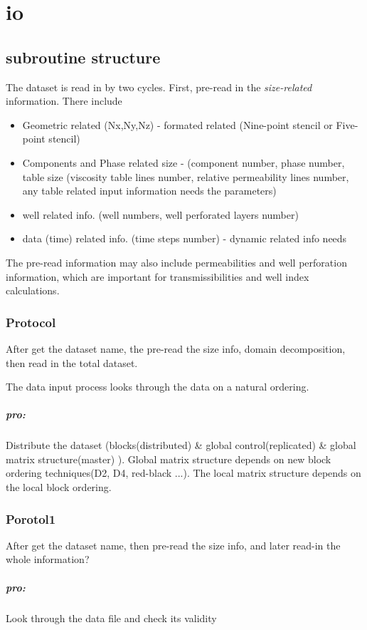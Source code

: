 \chapter{io}
\section{subroutine structure}
The dataset is read in by two cycles. First, pre-read in the \emph{size-related} information. There include
\begin{itemize}
\item Geometric related (Nx,Ny,Nz) - formated related (Nine-point stencil or Five-point stencil)
\item Components and Phase related size - (component number, phase number, table size (viscosity table lines number, relative permeability lines number,
any table related input information needs the parameters)
\item well related info. (well numbers, well perforated layers number)
\item data (time) related info.  (time steps number) - dynamic related info needs
\end{itemize}
The pre-read information may also include permeabilities and well perforation information, which are important for transmissibilities and well index calculations. 
\subsection{Protocol}
After get the dataset name, the pre-read the size info, domain decomposition, then read in the total dataset. 

The data input process looks through the data on a natural ordering. 
\paragraph{pro:} Distribute the dataset (blocks(distributed) \& global control(replicated) \& global matrix structure(master) ). Global matrix structure depends on new block ordering techniques(D2, D4, red-black ...). The local matrix structure depends on the local block ordering. 
\subsection{Porotol1}
After get the dataset name, then pre-read the size info, and later read-in the whole information?
\paragraph{pro:} Look through the data file and check its validity
